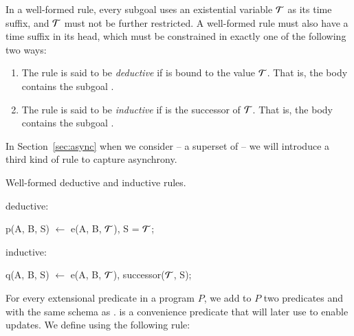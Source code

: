 %
%
In a well-formed \slang rule, every subgoal uses an existential variable $\Tau$
as its time suffix, and $\Tau$ must not be further restricted.  A well-formed
\slang rule must also have a time suffix  in its head, which must be
constrained in exactly one of the following two ways:
\begin{enumerate}
%
\item The rule is said to be \emph{deductive} if  is bound to the
value $\Tau$.  That is, the body contains the subgoal .
%
\item The rule is said to be {\em inductive} if  is the successor of
$\Tau$.  That is, the body contains the subgoal .
%
\end{enumerate}

In Section~\ref{sec:async} when we consider \lang -- a superset of \slang -- we will
introduce a third kind of rule to capture asynchrony.

\begin{example}
Well-formed deductive and inductive rules.

deductive:\\
\begin{Dedalus}
p(A, B, S) \(\leftarrow\) e(A, B, \(\Tau\)), S = \(\Tau\);
\end{Dedalus}
inductive:\\
\begin{Dedalus}
q(A, B, S) \(\leftarrow\) e(A, B, \(\Tau\)), successor(\(\Tau\), S);
\end{Dedalus}
\end{example}

For every extensional predicate  in a \slang program $P$, we add to
$P$ two predicates  and  with the same schema
as .   is a convenience predicate that will later
use to enable updates.  We define  using the following rule:

